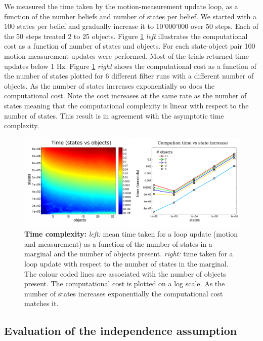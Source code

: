 We measured the time taken by the motion-measurement update loop, as a function of the number beliefs and number of states per belief. 
We started with a 100 states per belief and gradually increase it to 10'000'000 over 50 steps. Each of the 50 steps treated 2 to 25  objects. 
Figure \ref{fig:time_complexity} \textit{left} illustrates the computational
cost as a function of number of states and objects. For each state-object pair 100 motion-measurement updates were performed. Most of the trials returned time updates 
below 1 Hz. Figure \ref{fig:time_complexity} \textit{right} shows the computational cost as a function of the number of states plotted for 6 different filter runs with
a different number of objects. As the number of states increases exponentially so does the computational cost. Note the cost increases at the same
rate as the number of states meaning that the computational complexity is linear with respect to the number of states. This result is in agreement with 
the asymptotic time complexity.

\begin{figure}
 \includegraphics[width=\textwidth]{./ch5-MLMF/Figures/Figure12_v2.pdf}
 \caption{\textbf{Time complexity:} \textit{left:} mean time taken for a loop update (motion and measurement) as a function of the number of states in a marginal and the 
 number of objects present. \textit{right:} time taken for a loop update with respect to the number of states in the marginal. The colour coded lines are 
 associated with the number of objects present. The computational cost is plotted on a log scale. As the number of states increases exponentially the
 computational cost matches it.}
 \label{fig:time_complexity}
\end{figure}


\subsection{Evaluation of the independence assumption}\label{subsec:eval_indep_assumptiom}

